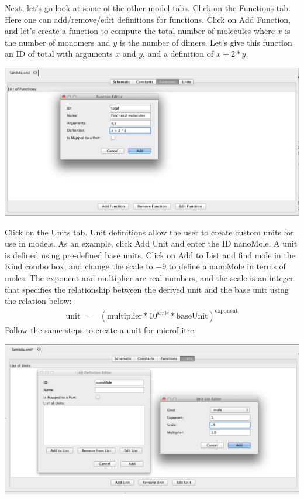 \documentclass[titlepage,11pt]{article}
\begin{document}
Next, let's go look at some of the other model tabs.  Click on the Functions tab.  Here one can add/remove/edit definitions for functions.  Click on Add Function, and let's create a function to compute the total number of molecules where $x$ is the number of monomers and $y$ is the number of dimers.  Let's give this function an ID of total with arguments $x$ and $y$, and a definition of $x + 2 * y$.

\begin{center}
\includegraphics[width=160mm]{screenshots/function}
\end{center}

Click on the Units tab.  Unit definitions allow the user to create custom units for use in models.  As an example, click Add Unit and enter the ID nanoMole.  A unit is defined using pre-defined base units.  Click on Add to List and find mole in the Kind combo box, and change the scale to $-9$ to define a nanoMole in terms of moles. The exponent and multiplier are real numbers, and the scale is an integer that specifies the relationship between the derived unit and the base unit using the relation below:
\begin{eqnarray*}
\mathrm{unit} & = & (\mathrm{multiplier} * 10^\mathrm{scale} * \mathrm{baseUnit})^\mathrm{exponent}
\end{eqnarray*}
Follow the same steps to create a unit for microLitre.

\begin{center}
\includegraphics[width=160mm]{screenshots/units}
\end{center}
\end{document}
